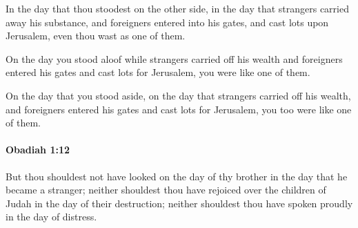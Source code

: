 			\begin{versebox}
					\item[BHS] 
					\item[LXX] 
					\item[ASV] In the day that thou stoodest on the other side, in the day that strangers carried away his substance, and foreigners entered into his gates, and cast lots upon Jerusalem, even thou wast as one of them.
					\item[NIV] On the day you stood aloof while strangers carried off his wealth and foreigners entered his gates and cast lots for Jerusalem, you were like one of them.
					\item[NRSV] On the day that you stood aside, on the day that strangers carried off his wealth, and foreigners entered his gates and cast lots for Jerusalem, you too were like one of them.
			\end{versebox}

		\paragraph{Obadiah 1:12} %
			\label{OBADIAH-1-12}

			But thou shouldest not have looked on the day of thy brother in the day that he became a stranger; neither shouldest thou have rejoiced over the children of Judah in the day of their destruction; neither shouldest thou have spoken proudly in the day of distress.


